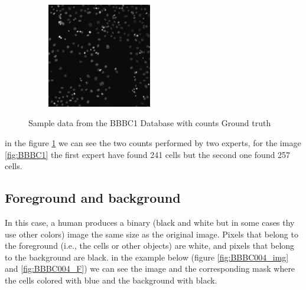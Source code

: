 \begin{figure}[H]
\begin{minipage}[c]{\linewidth}
\centering
\includegraphics[width = 2.5in, height = 1.8in]{../images/AS_09125_050118150001_A03f05d0.jpg}
\label{fig:BBBC1}
\end{minipage}

\begin{minipage}[c]{\linewidth}
\centering

\label{fig:BBBC001_Counts}
\end{minipage}
\caption{Sample data from the BBBC1 Database with counts Ground truth}
\end{figure}

in the figure \ref{fig:BBBC001_Counts} we can see the two counts performed by two experts, for the image \ref{fig:BBBC1} the first expert have found 241 cells but the second one found 257 cells.

\subsection{Foreground and background}
\hspace{\parindent}
In this case, a human produces a binary (black and white but in some cases thy use other colors) image the same size as the original image. Pixels that belong to the foreground (i.e., the cells or other objects) are white, and pixels that belong to the background are black. in the example below (figure \ref{fig:BBBC004_img} and \ref{fig:BBBC004_F}) we can see the image and the corresponding mask where the cells colored with blue and the background with black.

